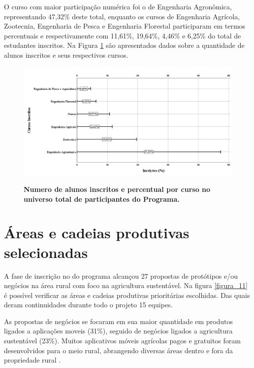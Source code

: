 O curso com maior participação numérica foi o de Engenharia Agronômica, representando 47,32\% deste total, enquanto os cursos de Engenharia Agrícola, Zootecnia, Engenharia de Pesca e Engenharia Florestal participaram em termos percentuais e respectivamente com 11,61\%, 19,64\%, 4,46\% e 6,25\% do total de estudantes inscritos. Na Figura \ref{figura_10} são apresentados dados sobre a quantidade de alunos inscritos e seus respectivos cursos.



\begin{figure}[H]
\caption{\textbf{Numero de alunos inscritos e percentual por curso no universo total de participantes do Programa.}}
\centering
\includegraphics[scale=0.3]{Imagens/inscritos.png}
\label{figura_10}
\end{figure}



\section{Áreas e cadeias produtivas selecionadas}

A fase de inscrição no do programa alcançou 27 propostas de protótipos e/ou negócios na área rural com foco na agricultura sustentável. Na figura \ref{figura_11} é possível verificar as áreas e cadeias produtivas prioritárias escolhidas. Das quais deram continuidades durante todo o projeto 15 equipes.

As propostas de negócios se focaram em sua maior quantidade em produtos ligados a aplicações moveis (31\%), seguido de negócios ligados a agricultura sustentável (23\%). Muitos aplicativos móveis agrícolas pagos e gratuitos foram desenvolvidos para o meio rural, abrangendo diversas áreas dentro e fora da propriedade rural \cite{silva_caracterizacao_2017}. 




